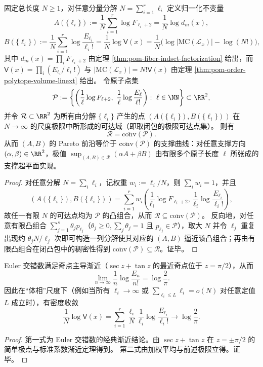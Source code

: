 \begin{theorem}\label{thm:pom-fiber-ab-convex-hull}
固定总长度 \(N\ge 1\)，对任意分量分解 \(N=\sum_{i=1}^r \ell_i\) 定义归一化不变量
\[
A(\{\ell_i\})
:=\frac{1}{N}\sum_{i=1}^r \log F_{\ell_i+2}
=\frac{1}{N}\log d_m(x),
\]
\[
B(\{\ell_i\})
:=\frac{1}{N}\sum_{i=1}^r \log\frac{E_{\ell_i}}{\ell_i!}
=\frac{1}{N}\log \mathsf V(x)
=\frac{1}{N}\bigl(\log|\mathrm{MC}(\mathcal L_x)|-\log(N!)\bigr),
\]
其中 \(d_m(x)=\prod_i F_{\ell_i+2}\) 由定理 \ref{thm:pom-fiber-indset-factorization} 给出，而 \(\mathsf V(x)=\prod_i (E_{\ell_i}/\ell_i!)\) 与 \(|\mathrm{MC}(\mathcal L_x)|=N!\mathsf V(x)\) 由定理 \ref{thm:pom-order-polytope-volume-linext} 给出。
令原子点集
\[
\mathcal P
:=
\left\{
\left(\frac{1}{\ell}\log F_{\ell+2},\ \frac{1}{\ell}\log\frac{E_\ell}{\ell!}\right):\ \ell\in\NN
\right\}
\subset\RR^2,
\]
并令 \(\mathcal R\subset\RR^2\) 为所有由分解 \(\{\ell_i\}\) 产生的点 \((A(\{\ell_i\}),B(\{\ell_i\}))\) 在 \(N\to\infty\) 的尺度极限中所形成的可达域（即取闭包的极限可达点集）。
则有
\[
\mathcal R=\overline{\mathrm{conv}}(\mathcal P).
\]
从而 \((A,B)\) 的 Pareto 前沿等价于 \(\overline{\mathrm{conv}}(\mathcal P)\) 的支撑曲线：对任意支撑方向 \((\alpha,\beta)\in\RR^2\)，极值 \(\sup_{(A,B)\in\mathcal R}(\alpha A+\beta B)\) 由有限多个原子长度 \(\ell\) 所张成的支撑超平面实现。
\end{theorem}
\begin{proof}
对任意分解 \(N=\sum_i \ell_i\)，记权重 \(w_i:=\ell_i/N\)，则 \(\sum_i w_i=1\)，并且
\[
(A(\{\ell_i\}),B(\{\ell_i\}))
=\sum_{i=1}^r w_i\left(\frac{1}{\ell_i}\log F_{\ell_i+2},\ \frac{1}{\ell_i}\log\frac{E_{\ell_i}}{\ell_i!}\right),
\]
故任一有限 \(N\) 的可达点均为 \(\mathcal P\) 的凸组合，从而 \(\mathcal R\subseteq \overline{\mathrm{conv}}(\mathcal P)\)。
反向地，对任意有限凸组合 \(\sum_{j=1}^s \theta_j p_{\ell_j}\)（\(\theta_j\ge 0,\sum_j\theta_j=1\) 且 \(p_{\ell_j}\in\mathcal P\)），取大 \(N\) 并令 \(\ell_j\) 重复出现约 \(\theta_j N/\ell_j\) 次即可构造一列分解使其对应的 \((A,B)\) 逼近该凸组合；再由有限凸组合在闭凸包中的稠密性得到 \(\overline{\mathrm{conv}}(\mathcal P)\subseteq \mathcal R\)。证毕。
\end{proof}



\begin{theorem}\label{thm:pom-fence-volume-log2pi}
Euler 交错数满足奇点主导渐近（\(\sec z+\tan z\) 的最近奇点位于 \(z=\pi/2\)），从而
\[
\lim_{n\to\infty}\frac{1}{n}\log\frac{E_n}{n!}=\log\frac{2}{\pi}.
\]
因此在“体相”尺度下（例如当所有 \(\ell_i\to\infty\) 或 \(\sum_{\ell_i\le L}\ell_i=o(N)\) 对任意定值 \(L\) 成立时），有密度收敛
\[
\frac{1}{N}\log\mathsf V(x)
=\sum_{i=1}^r \frac{\ell_i}{N}\,\frac{1}{\ell_i}\log\frac{E_{\ell_i}}{\ell_i!}
\longrightarrow
\log\frac{2}{\pi}.
\]
\end{theorem}
\begin{proof}
第一式为 Euler 交错数的经典渐近结论。由 \(\sec z+\tan z\) 在 \(z=\pm\pi/2\) 的简单极点与标准系数渐近定理得到。
第二式由加权平均与前述极限立得。证毕。
\end{proof}

